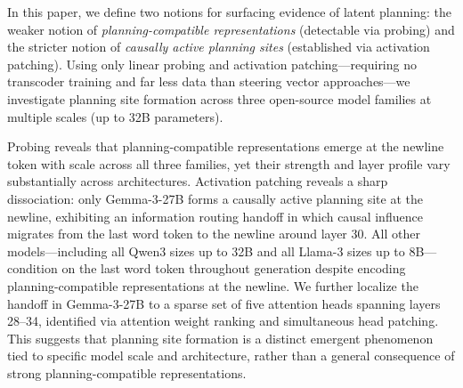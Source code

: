 \documentclass{article}
\begin{document}
In this paper, we define two notions for surfacing evidence of latent planning: the weaker notion of \textit{planning-compatible representations} (detectable via probing) and the stricter notion of \textit{causally active planning sites} (established via activation patching). Using only linear probing and activation patching---requiring no transcoder training and far less data than steering vector approaches---we investigate planning site formation across three open-source model families at multiple scales (up to 32B parameters).

Probing reveals that planning-compatible representations emerge at the newline token with scale across all three families, yet their strength and layer profile vary substantially across architectures. Activation patching reveals a sharp dissociation: only Gemma-3-27B forms a causally active planning site at the newline, exhibiting an information routing handoff in which causal influence migrates from the last word token to the newline around layer 30. All other models---including all Qwen3 sizes up to 32B and all Llama-3 sizes up to 8B---condition on the last word token throughout generation despite encoding planning-compatible representations at the newline. We further localize the handoff in Gemma-3-27B to a sparse set of five attention heads spanning layers 28--34, identified via attention weight ranking and simultaneous head patching. This suggests that planning site formation is a distinct emergent phenomenon tied to specific model scale and architecture, rather than a general consequence of strong planning-compatible representations.

\end{document}
